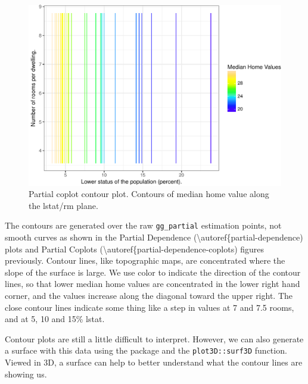 \documentclass[article]{jss}
\begin{document}
\begin{CodeChunk}
\begin{figure}

{\centering \includegraphics{Regression-rfsrc_files/figure-latex/contour3d-1} 

}

\caption[Partial coplot contour plot]{Partial coplot contour plot. Contours of median home value along the lstat/rm plane.}\label{fig:contour3d}
\end{figure}
\end{CodeChunk}

The contours are generated over the raw \texttt{gg\_partial} estimation
points, not smooth curves as shown in the Partial Dependence
(\textbackslash{}autoref\{partial-dependence) plots and Partial Coplots
(\textbackslash{}autoref\{partial-dependence-coplots) figures
previously. Contour lines, like topographic maps, are concentrated where
the slope of the surface is large. We use color to indicate the
direction of the contour lines, so that lower median home values are
concentrated in the lower right hand corner, and the values increase
along the diagonal toward the upper right. The close contour lines
indicate some thing like a step in values at 7 and 7.5 rooms, and at 5,
10 and 15\% lstat.

Contour plots are still a little difficult to interpret. However, we can
also generate a surface with this data using the  package
\citep{plot3D:2014} and the \texttt{plot3D::surf3D} function. Viewed in
3D, a surface can help to better understand what the contour lines are
showing us.
\end{document}
